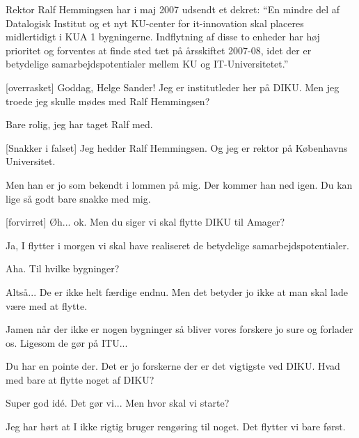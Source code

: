 \documentclass[a4paper,11pt]{article}
\begin{document}
  
\begin{sketch}


 Rektor Ralf Hemmingsen har i maj 2007 udsendt et dekret: ``En mindre del af Datalogisk Institut og et nyt KU-center for it-innovation
skal placeres midlertidigt i KUA 1 bygningerne. Indflytning af disse to enheder har
høj prioritet og forventes at finde sted tæt på årsskiftet 2007-08, idet
der er betydelige samarbejdspotentialer mellem KU og IT-Universitetet.''


[overrasket] Goddag, Helge Sander!  Jeg er
institutleder her på DIKU. Men jeg troede jeg skulle mødes 
med Ralf Hemmingsen?

 Bare rolig, jeg har taget Ralf med. 

[Snakker i falset] Jeg hedder Ralf Hemmingsen. Og jeg er rektor på Københavns Universitet.

 Men han er jo som bekendt i lommen på mig. Der kommer han ned igen.   Du kan lige så godt bare snakke med mig.

[forvirret] Øh... ok. Men du siger vi skal flytte DIKU til Amager?

 Ja, I flytter i morgen vi skal have realiseret de betydelige samarbejdspotentialer.

 Aha. Til hvilke bygninger?

 Altså... De er ikke helt færdige endnu. Men det betyder jo ikke at man skal lade være med at flytte.

 Jamen når der ikke er nogen bygninger så bliver vores forskere jo
sure og forlader os. Ligesom de gør på ITU...

 Du har en pointe der. Det er jo forskerne der er det vigtigste ved DIKU. Hvad med bare at flytte noget af DIKU?

 Super god idé. Det gør vi... Men hvor skal vi starte?

 Jeg har hørt at I ikke rigtig bruger rengøring til noget. Det flytter vi bare først.


\end{sketch}
\end{document}
